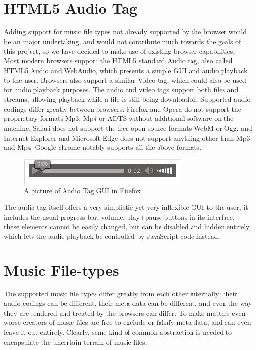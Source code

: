 \section{HTML5 Audio Tag}
\label{sec:HTML5_audio_tag}

Adding support for music file types not already supported by the browser 
would be an major undertaking, 
and would not contribute much towards the goals of this project, 
so we have decided to make use of existing browser capabilities.
\newline\newline
Most modern browsers support the \acs{HTML}5 standard Audio tag,
also called \acs{HTML}5 Audio and WebAudio,
which presents a simple \acs{GUI} and audio playback to the user.
Browsers also support a similar Video tag, 
which could also be used for audio playback purposes.
The audio and video tags support both files and streams, 
allowing playback while a file is still being downloaded.
\newline
Supported audio codings differ greatly between browsers:
Firefox and Opera do not support the proprietary formats Mp3, Mp4 or ADTS
without additional software on the machine.
Safari does not support the free open source formats WebM or Ogg,
and Internet Explorer and Microsoft Edge does not support anything other than Mp3 and Mp4.
Google chrome notably supports all the above formats.
\newline

\begin{figure}[h]
    \centering
    \includegraphics[scale=0.5]{gfx/audioTag.jpg}
    \caption{A picture of Audio Tag \acs{GUI} in Firefox}
    \label{fig:audiotag}
\end{figure}

The audio tag itself offers a very simplistic yet very inflexible \acs{GUI} to the user, 
it includes the usual progress bar, volume, play+pause buttons in its interface, 
these elements cannot be easily changed, but can be disabled and hidden entirely, 
which lets the audio playback be controlled by JavaScript code instead.

\section{Music File-types}
The supported music file types differ greatly from each other internally; 
their audio codings can be different, their meta-data can be different,
and even the way they are rendered and treated by the browsers can differ.
To make matters even worse creators of music files are free to exclude or falsify meta-data, 
and can even leave it out entirely.
Clearly, some kind of common abstraction is needed to encapsulate the uncertain terrain of music files.


